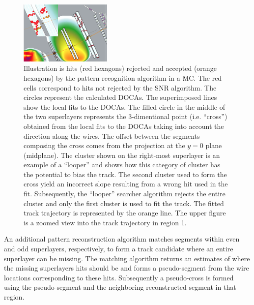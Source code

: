 \begin{figure}
\centering
\includegraphics[width=0.4\textwidth]{pics/dcPattern13.png}
\caption{
Illustration is hits (red hexagons) rejected and accepted (orange hexagons) by the pattern recognition algorithm in a MC.  
The red cells correspond to hits not rejected by the SNR algorithm.  The circles represent the calculated DOCAs.  The superimposed lines show the local fits to the DOCAs.  The filled circle in the middle of the two superlayers represents the 3-dimentional point (i.e. ``cross'') obtained from the local fits to the DOCAs taking into account the direction along the wires.
The offset between the segments composing the cross comes from the projection at the $y=0$ plane (midplane).
The cluster shown on the right-most superlayer is an example of a ``looper'' and shows how this category of cluster has the potential to bias the track.  The second cluster used to form the cross yield an incorrect slope resulting from a wrong hit used in the fit.  Subsequently, the ``looper'' searcher algorithm rejects the entire cluster and only the first cluster is used to fit the track.  The fitted track trajectory is represented by the orange line. 
The upper figure is a zoomed view into the track trajectory in region 1.
}
\label{fig:dcsegs}
\end{figure}


An additional  pattern reconstruction algorithm  matches segments within even and odd superlayers, respectively, to form
a track candidate where an entire superlayer can be missing.  The matching algorithm returns an estimates of where the missing
superlayers hits should be and forms a pseudo-segment from the wire locations corresponding to these hits.  Subsequently
a pseudo-cross is formed using the pseudo-segment and the neighboring reconstructed segment in that region.

